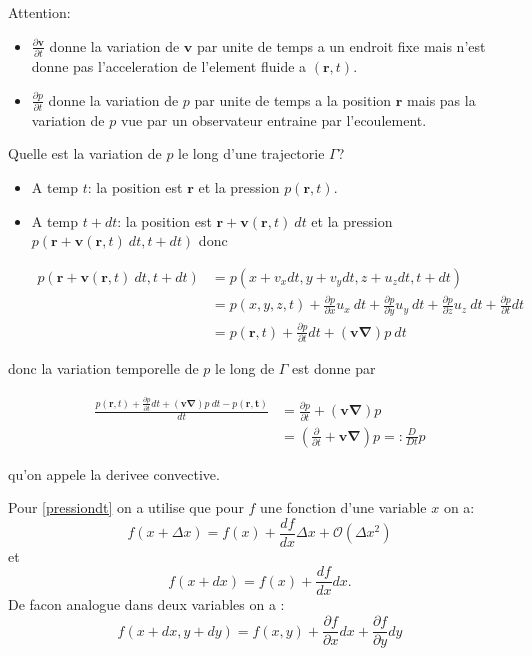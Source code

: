Attention: 
\begin{itemize}
\item $\frac{ \partial \boldsymbol{v} }{ \partial t }$ donne la variation de $\boldsymbol{v}$ par unite de temps a un endroit fixe mais n'est donne pas l'acceleration de l'element fluide a $(\boldsymbol{r},t)$.
\item $\frac{ \partial p }{ \partial t }$ donne la variation de $p$ par unite de temps a la position $\boldsymbol{r}$ mais pas la variation de $p$ vue par un observateur entraine par l'ecoulement.
\end{itemize}
\begin{question}
Quelle est la variation de $p$ le long d'une trajectorie $\Gamma$?
\end{question}
\begin{answer}
\begin{itemize}
\item A temp $t$: la position est $\boldsymbol{r}$ et la pression $p(\boldsymbol{r},t)$.
\item A temp $t+dt$: la position est $\boldsymbol{r}+\boldsymbol{v}(\boldsymbol{r},t)~dt$  et la pression $p(\boldsymbol{r}+\boldsymbol{v}(\boldsymbol{r},t)~dt,t+dt)$ donc

\begin{align*}
p(\boldsymbol{r}+\boldsymbol{v}(\boldsymbol{r},t)~dt,t+dt) & =p(x+v_{x}dt,y+v_{y}dt,z+u_{z}dt,t+dt ) \\
 & =p(x,y,z,t)+\frac{ \partial p }{ \partial x } u_{x}~dt+\frac{ \partial p }{ \partial y } u_{y}~dt+\frac{ \partial p }{ \partial z } u_{z}~dt +\frac{ \partial p }{ \partial t } dt \tag{\star}\label{pressiondt} \\
 & = p(\boldsymbol{r},t)+\frac{ \partial p }{ \partial t } dt+(\boldsymbol{v}\boldsymbol{\nabla})p~dt
\end{align*}

\end{itemize}
donc la variation temporelle de $p$ le long de $\Gamma$ est donne par 

\begin{align*}
\frac{p(\boldsymbol{r},t)+\frac{ \partial p }{ \partial t } dt+(\boldsymbol{v}\boldsymbol{\nabla})p~dt-p(\boldsymbol{r,t})}{dt} & =\frac{ \partial p }{ \partial t } +(\boldsymbol{v}\boldsymbol{\nabla})p  \\
 & =\left( \frac{ \partial  }{ \partial t } +\boldsymbol{v\nabla} \right)p=: \frac{D}{Dt}p
\end{align*}

qu'on appele la derivee convective.
\begin{reminder}
Pour \ref{pressiondt} on a utilise que pour $f$ une fonction d'une variable $x$ on a:
$$
f(x+\Delta x)=f(x)+\frac{df}{dx}\Delta x+\mathcal{O}(\Delta x^{2})
$$
et 
$$
f(x+dx)=f(x)+\frac{df}{dx}dx.
$$
De facon analogue dans deux variables on a :
$$
f(x+dx,y+dy)=f(x,y)+\frac{ \partial f }{ \partial x } dx+\frac{ \partial f }{ \partial y } dy
$$
\end{reminder}

\end{answer}

